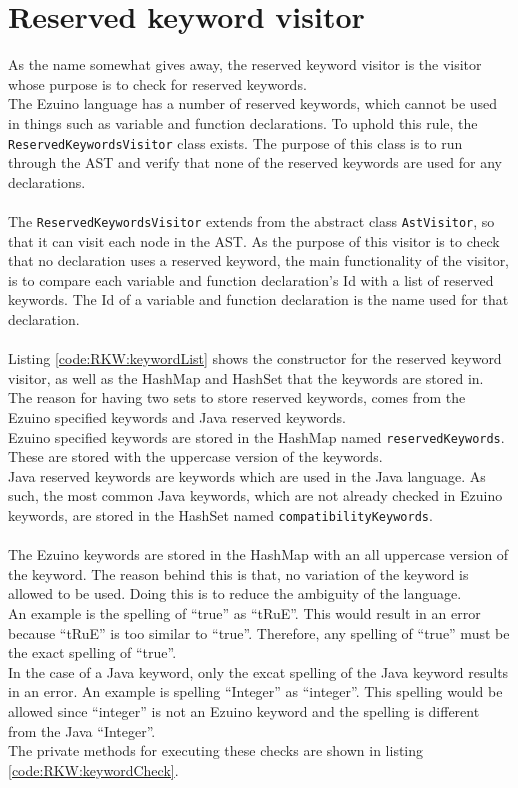 \section{Reserved keyword visitor}
As the name somewhat gives away, the reserved keyword visitor is the visitor whose purpose is to check for reserved keywords.\\
The Ezuino language has a number of reserved keywords, which cannot be used in things such as variable and function declarations. To uphold this rule, the \texttt{ReservedKeywordsVisitor} class exists. The purpose of this class is to run through the AST and verify that none of the reserved keywords are used for any declarations.
\\\\
The \texttt{ReservedKeywordsVisitor} extends from the abstract class \texttt{AstVisitor}, so that it can visit each node in the AST. As the purpose of this visitor is to check that no declaration uses a reserved keyword, the main functionality of the visitor, is to compare each variable and function declaration's Id with a list of reserved keywords. The Id of a variable and function declaration is the name used for that declaration.
\\\\
Listing \ref{code:RKW:keywordList} shows the constructor for the reserved keyword visitor, as well as the HashMap and HashSet that the keywords are stored in. The reason for having two sets to store reserved keywords, comes from the Ezuino specified keywords and Java reserved keywords.\\
Ezuino specified keywords are stored in the HashMap named \texttt{reservedKeywords}. These are stored with the uppercase version of the keywords.\\
Java reserved keywords are keywords which are used in the Java language. As such, the most common Java keywords, which are not already checked in Ezuino keywords, are stored in the HashSet named \texttt{compatibilityKeywords}.
\\\\
The Ezuino keywords are stored in the HashMap with an all uppercase version of the keyword. The reason behind this is that, no variation of the keyword is allowed to be used. Doing this is to reduce the ambiguity of the language.\\
An example is the spelling of “true” as “tRuE”. This would result in an error because “tRuE” is too similar to “true”. Therefore, any spelling of “true” must be the exact spelling of “true”.\\
In the case of a Java keyword, only the excat spelling of the Java keyword results in an error. An example is spelling “Integer” as “integer”. This spelling would be allowed since “integer” is not an Ezuino keyword and the spelling is different from the Java “Integer”.\\
The private methods for executing these checks are shown in listing \ref{code:RKW:keywordCheck}.\\

